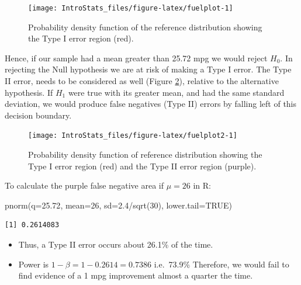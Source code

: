 \documentclass[
  oneside]{krantz}
\newenvironment{Shaded}{\begin{snugshade}}{\end{snugshade}}
\newcommand{\AttributeTok}[1]{\textcolor[rgb]{0.77,0.63,0.00}{#1}}
\newcommand{\ConstantTok}[1]{\textcolor[rgb]{0.00,0.00,0.00}{#1}}
\newcommand{\DecValTok}[1]{\textcolor[rgb]{0.00,0.00,0.81}{#1}}
\newcommand{\FloatTok}[1]{\textcolor[rgb]{0.00,0.00,0.81}{#1}}
\newcommand{\FunctionTok}[1]{\textcolor[rgb]{0.00,0.00,0.00}{#1}}
\newcommand{\NormalTok}[1]{#1}
\newcommand{\SpecialCharTok}[1]{\textcolor[rgb]{0.00,0.00,0.00}{#1}}
\providecommand{\tightlist}{%
  \setlength{\itemsep}{0pt}\setlength{\parskip}{0pt}}
\begin{document}
\begin{figure}

{\centering \texttt{[image: IntroStats\_files/figure-latex/fuelplot-1]} 

}

\caption{Probability density function of the reference distribution showing the Type I error region (red).}\label{fig:fuelplot}
\end{figure}

Hence, if our sample had a mean greater than 25.72 mpg we would reject \(H_0\). In rejecting the Null hypothesis we are at risk of making a Type I error. The Type II error, needs to be considered as well (Figure \ref{fig:fuelplot2}), relative to the alternative hypothesis. If \(H_1\) were true with its greater mean, and had the same standard deviation, we would produce false negatives (Type II) errors by falling left of this decision boundary.

\begin{figure}

{\centering \texttt{[image: IntroStats\_files/figure-latex/fuelplot2-1]} 

}

\caption{Probability density function of reference distribution showing the Type I error region (red) and the Type II error region (purple).}\label{fig:fuelplot2}
\end{figure}

To calculate the purple false negative area if \(\mu = 26\) in R:

\begin{Shaded}
\begin{Highlighting}[]
\FunctionTok{pnorm}\NormalTok{(}\AttributeTok{q=}\FloatTok{25.72}\NormalTok{, }\AttributeTok{mean=}\DecValTok{26}\NormalTok{, }\AttributeTok{sd=}\FloatTok{2.4}\SpecialCharTok{/}\FunctionTok{sqrt}\NormalTok{(}\DecValTok{30}\NormalTok{), }\AttributeTok{lower.tail=}\ConstantTok{TRUE}\NormalTok{)}
\end{Highlighting}
\end{Shaded}

\begin{verbatim}
[1] 0.2614083
\end{verbatim}

\begin{itemize}
\tightlist
\item
  Thus, a Type II error occurs about 26.1\% of the time.
\item
  Power is \(1-\beta = 1 - 0.2614 = 0.7386\) i.e.~73.9\%
  Therefore, we would fail to find evidence of a 1 mpg improvement almost a quarter the time.
\end{itemize}
\end{document}
